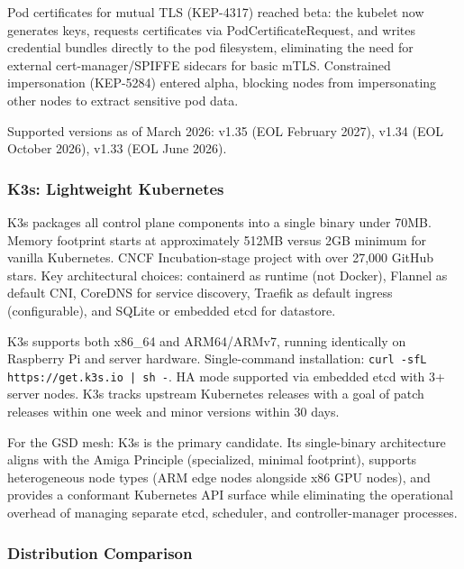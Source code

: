 \documentclass[11pt,letterpaper]{article}
\begin{document}
Pod certificates for mutual TLS (KEP-4317) reached beta: the kubelet now generates keys, requests certificates via PodCertificateRequest, and writes credential bundles directly to the pod filesystem, eliminating the need for external cert-manager/SPIFFE sidecars for basic mTLS. Constrained impersonation (KEP-5284) entered alpha, blocking nodes from impersonating other nodes to extract sensitive pod data.

Supported versions as of March 2026: v1.35 (EOL February 2027), v1.34 (EOL October 2026), v1.33 (EOL June 2026).

\subsubsection{K3s: Lightweight Kubernetes}
K3s packages all control plane components into a single binary under 70MB. Memory footprint starts at approximately 512MB versus 2GB minimum for vanilla Kubernetes. CNCF Incubation-stage project with over 27,000 GitHub stars. Key architectural choices: containerd as runtime (not Docker), Flannel as default CNI, CoreDNS for service discovery, Traefik as default ingress (configurable), and SQLite or embedded etcd for datastore.

K3s supports both x86\_64 and ARM64/ARMv7, running identically on Raspberry Pi and server hardware. Single-command installation: \texttt{curl -sfL https://get.k3s.io | sh -}. HA mode supported via embedded etcd with 3+ server nodes. K3s tracks upstream Kubernetes releases with a goal of patch releases within one week and minor versions within 30 days.

For the GSD mesh: K3s is the primary candidate. Its single-binary architecture aligns with the Amiga Principle (specialized, minimal footprint), supports heterogeneous node types (ARM edge nodes alongside x86 GPU nodes), and provides a conformant Kubernetes API surface while eliminating the operational overhead of managing separate etcd, scheduler, and controller-manager processes.

\subsubsection{Distribution Comparison}
\end{document}
